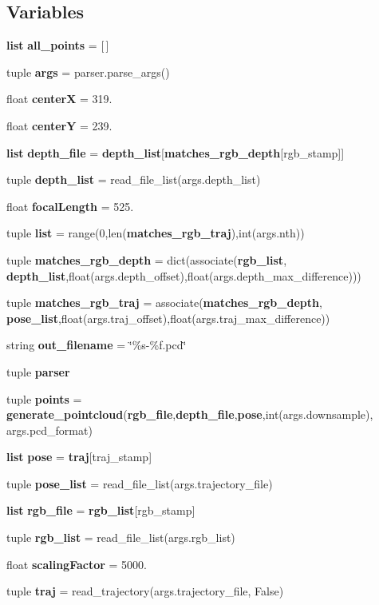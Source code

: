 \subsection*{\-Variables}
\begin{DoxyCompactItemize}
\item 
{\bf list} {\bf all\-\_\-points} = [$\,$]
\item 
tuple {\bf args} = parser.\-parse\-\_\-args()
\item 
float {\bf center\-X} = 319.
\item 
float {\bf center\-Y} = 239.
\item 
{\bf list} {\bf depth\-\_\-file} = {\bf depth\-\_\-list}[{\bf matches\-\_\-rgb\-\_\-depth}[rgb\-\_\-stamp]]
\item 
tuple {\bf depth\-\_\-list} = read\-\_\-file\-\_\-list(args.\-depth\-\_\-list)
\item 
float {\bf focal\-Length} = 525.
\item 
tuple {\bf list} = range(0,len({\bf matches\-\_\-rgb\-\_\-traj}),int(args.\-nth))
\item 
tuple {\bf matches\-\_\-rgb\-\_\-depth} = dict(associate({\bf rgb\-\_\-list}, {\bf depth\-\_\-list},float(args.\-depth\-\_\-offset),float(args.\-depth\-\_\-max\-\_\-difference)))
\item 
tuple {\bf matches\-\_\-rgb\-\_\-traj} = associate({\bf matches\-\_\-rgb\-\_\-depth}, {\bf pose\-\_\-list},float(args.\-traj\-\_\-offset),float(args.\-traj\-\_\-max\-\_\-difference))
\item 
string {\bf out\-\_\-filename} = \char`\"{}\%s-\/\%f.\-pcd\char`\"{}
\item 
tuple {\bf parser}
\item 
tuple {\bf points} = {\bf generate\-\_\-pointcloud}({\bf rgb\-\_\-file},{\bf depth\-\_\-file},{\bf pose},int(args.\-downsample), args.\-pcd\-\_\-format)
\item 
{\bf list} {\bf pose} = {\bf traj}[traj\-\_\-stamp]
\item 
tuple {\bf pose\-\_\-list} = read\-\_\-file\-\_\-list(args.\-trajectory\-\_\-file)
\item 
{\bf list} {\bf rgb\-\_\-file} = {\bf rgb\-\_\-list}[rgb\-\_\-stamp]
\item 
tuple {\bf rgb\-\_\-list} = read\-\_\-file\-\_\-list(args.\-rgb\-\_\-list)
\item 
float {\bf scaling\-Factor} = 5000.
\item 
tuple {\bf traj} = read\-\_\-trajectory(args.\-trajectory\-\_\-file, \-False)
\end{DoxyCompactItemize}


